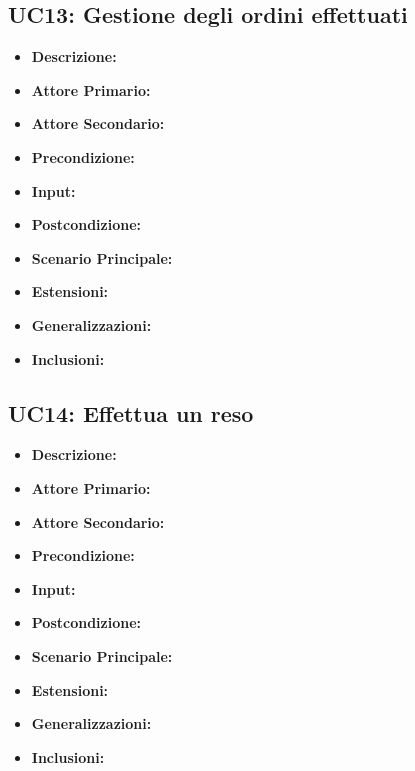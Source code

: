         \subsection{UC13: Gestione degli ordini effettuati}
        \begin{itemize}
            \item \textbf{Descrizione:}
            \item \textbf{Attore Primario:}
            \item \textbf{Attore Secondario:}
            \item \textbf{Precondizione:}
            \item \textbf{Input:}
            \item \textbf{Postcondizione:}
            \item \textbf{Scenario Principale:}
            \item \textbf{Estensioni:}
            \item \textbf{Generalizzazioni:}
            \item \textbf{Inclusioni:}
        \end{itemize}


        \subsection{UC14: Effettua un reso}
        \begin{itemize}
            \item \textbf{Descrizione:}
            \item \textbf{Attore Primario:}
            \item \textbf{Attore Secondario:}
            \item \textbf{Precondizione:}
            \item \textbf{Input:}
            \item \textbf{Postcondizione:}
            \item \textbf{Scenario Principale:}
            \item \textbf{Estensioni:}
            \item \textbf{Generalizzazioni:}
            \item \textbf{Inclusioni:}
        \end{itemize}


